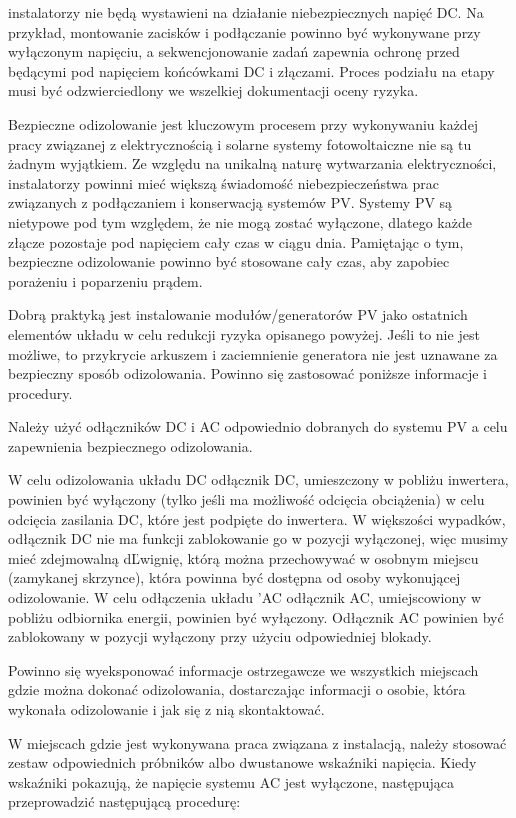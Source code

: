 \documentclass[12pt,a4paper]{article}
\begin{document}
instalatorzy nie będą wystawieni na działanie niebezpiecznych napięć DC. 
Na przykład, montowanie zacisków i podłączanie powinno być wykonywane 
przy wyłączonym napięciu, a sekwencjonowanie zadań zapewnia ochronę 
przed będącymi pod napięciem końcówkami DC i złączami. Proces podziału 
na etapy musi być odzwierciedlony we wszelkiej dokumentacji oceny 
ryzyka. 

 

Bezpieczne odizolowanie jest kluczowym procesem przy wykonywaniu każdej 
pracy związanej z elektrycznością i solarne systemy fotowoltaiczne nie 
są tu żadnym wyjątkiem. Ze względu na unikalną naturę wytwarzania 
elektryczności, instalatorzy powinni mieć większą świadomość 
niebezpieczeństwa prac związanych z podłączaniem i konserwacją systemów 
PV. Systemy PV są nietypowe pod tym względem, że nie mogą zostać 
wyłączone, dlatego każde złącze pozostaje pod napięciem cały czas w 
ciągu dnia. Pamiętając o tym, bezpieczne odizolowanie powinno być 
stosowane cały czas, aby zapobiec porażeniu i poparzeniu prądem. 

Dobrą praktyką jest instalowanie modułów/generatorów PV jako ostatnich 
elementów układu w celu redukcji ryzyka opisanego powyżej. Jeśli to nie 
jest możliwe, to przykrycie arkuszem i zaciemnienie generatora nie jest 
uznawane za bezpieczny sposób odizolowania. Powinno się zastosować 
poniższe informacje i procedury. 

Należy użyć odłączników DC i AC odpowiednio dobranych do systemu PV a 
celu zapewnienia bezpiecznego odizolowania. 

W celu odizolowania układu DC odłącznik DC, umieszczony w pobliżu 
inwertera, powinien być wyłączony (tylko jeśli ma możliwość odcięcia 
obciążenia) w celu odcięcia zasilania DC, które jest podpięte do 
inwertera. W większości wypadków, odłącznik DC nie ma funkcji 
zablokowanie go w pozycji wyłączonej, więc musimy mieć zdejmowalną 
dĽwignię, którą można przechowywać w osobnym miejscu (zamykanej 
skrzynce), która powinna być dostępna od osoby wykonującej odizolowanie. 
W celu odłączenia układu 'AC odłącznik AC, umiejscowiony w pobliżu 
odbiornika energii, powinien być wyłączony. Odłącznik AC powinien być 
zablokowany w pozycji wyłączony przy użyciu odpowiedniej blokady. 

Powinno się wyeksponować informacje ostrzegawcze we wszystkich miejscach 
gdzie można dokonać odizolowania, dostarczając informacji o osobie, 
która wykonała odizolowanie i jak się z nią skontaktować. 

W miejscach gdzie jest wykonywana praca związana z instalacją, należy 
stosować zestaw odpowiednich próbników albo dwustanowe wskaźniki 
napięcia. Kiedy wskaźniki pokazują, że napięcie systemu AC jest 
wyłączone, następująca przeprowadzić następującą procedurę: 
\end{document}
